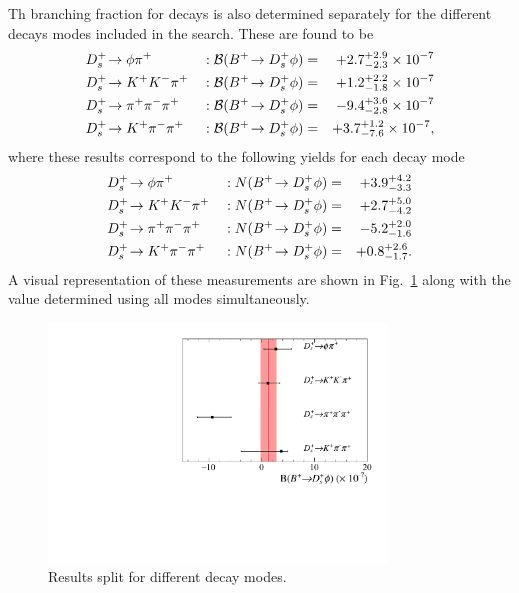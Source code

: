 {Th branching fraction for \decay{\Bp}{\Dsp\phiz} decays is also determined separately for the different \Dsp decays modes included in the search. These are found to be
\begin{equation}
  \left .
  \begin{aligned}
    &\decay{\Dsp}{\phiz\pip}      && : \BF(\decay{\Bp}{\Dsp\phiz}) = &+2.7^{+2.9}_{-2.3}\times 10^{-7}\\
    &\decay{\Dsp}{\Kp\Km\pip}     && : \BF(\decay{\Bp}{\Dsp\phiz}) = &+1.2^{+2.2}_{-1.8}\times 10^{-7}\\
    &\decay{\Dsp}{\pip\pim\pip}   && : \BF(\decay{\Bp}{\Dsp\phiz}) = &-9.4^{+3.6}_{-2.8}\times 10^{-7}\\
    &\decay{\Dsp}{\Kp\pim\pip}    && : \BF(\decay{\Bp}{\Dsp\phiz}) = &+3.7^{+1.2}_{-7.6}\times 10^{-7},\\
  \end{aligned} \right.
\end{equation} 
where these results correspond to the following yields for each \Dsp decay mode
\begin{equation}
  \left .
  \begin{aligned}
    &\decay{\Dsp}{\phiz\pip}      && : N(\decay{\Bp}{\Dsp\phiz}) = &+3.9^{+4.2}_{-3.3} \\
    &\decay{\Dsp}{\Kp\Km\pip}     && : N(\decay{\Bp}{\Dsp\phiz}) = &+2.7^{+5.0}_{-4.2} \\
    &\decay{\Dsp}{\pip\pim\pip}   && : N(\decay{\Bp}{\Dsp\phiz}) = &-5.2^{+2.0}_{-1.6} \\
    &\decay{\Dsp}{\Kp\pim\pip}    && : N(\decay{\Bp}{\Dsp\phiz}) = &+0.8^{+2.6}_{-1.7}. \\
  \end{aligned} \right.
\end{equation} 
A visual representation of these measurements are shown in Fig.~\ref{fig:B2DsPhi_split_Ds_results} along with the value determined using all modes simultaneously.

\begin{figure}[!h]
    \centering
        \includegraphics[width=0.8\textwidth]{figs/B2DsPhi/Split_Ds_modes.pdf}
        \caption{Results split for different \Dsp decay modes.}
    \label{fig:B2DsPhi_split_Ds_results}   
\end{figure}

}
